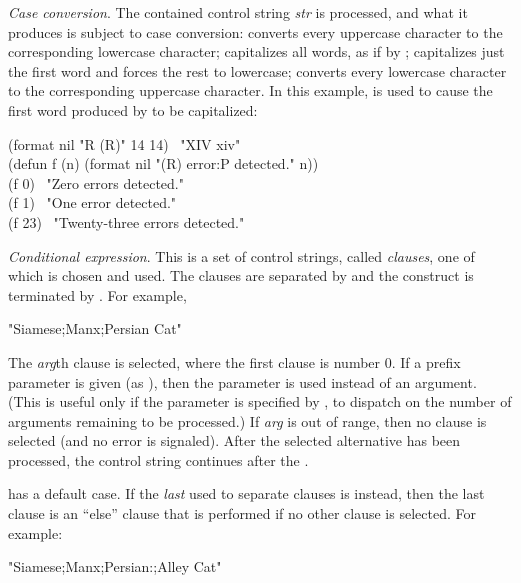\begin{flushdesc}
\item[\cd{{\Xtilde}(\emph{str}{\Xtilde})}]
\emph{Case conversion}.
The contained control string \emph{str} is processed, and what it produces
is subject to case conversion:
\cd{{\Xtilde}(} converts every uppercase character
to the corresponding lowercase character;
\cd{{\Xtilde}:(} capitalizes all words, as if by ;
\cd{{\Xtilde}{\Xatsign}(} capitalizes just the first word and forces the rest to lowercase;
\cd{{\Xtilde}:{\Xatsign}(} converts every lowercase character
to the corresponding uppercase character.
In this example, \cd{{\Xtilde}{\Xatsign}(} is used to cause the first word
produced by  to be capitalized:
\begin{lisp}
(format nil "{\Xtilde}{\Xatsign}R {\Xtilde}({\Xtilde}{\Xatsign}R{\Xtilde})" 14 14) \EV\ "XIV xiv" \\
(defun f (n) (format nil "{\Xtilde}{\Xatsign}({\Xtilde}R{\Xtilde}) error{\Xtilde}:P detected." n)) \\
(f 0) \EV\ "Zero errors detected." \\
(f 1) \EV\ "One error detected." \\
(f 23) \EV\ "Twenty-three errors detected."
\end{lisp}

\item[\cd{{\Xtilde}{\Xlbracket}\emph{str0}{\Xtilde};\emph{str1}{\Xtilde};\emph{...}{\Xtilde};\emph{strn}{\Xtilde}{\Xrbracket}}]
\emph{Conditional expression}.
This is a set of control strings, called \emph{clauses}, one of which is
chosen and used.  The clauses are separated by \cd{{\Xtilde};} and the construct
is terminated by \cd{{\Xtilde}{\Xrbracket}}.  For example,
\begin{lisp}
"{\Xtilde}{\Xlbracket}Siamese{\Xtilde};Manx{\Xtilde};Persian{\Xtilde}{\Xrbracket} Cat"
\end{lisp}
The \emph{arg}th
clause is selected, where the first clause is number 0.
If a prefix parameter is given (as ),
then the parameter is used instead of an argument.
(This is useful only if the parameter is specified by \cd{\#},
to dispatch on the number of arguments remaining to be processed.)
If \emph{arg} is out of range, then no clause is selected
(and no error is signaled).
After the selected alternative has been processed, the control string
continues after the \cd{{\Xtilde}{\Xrbracket}}.

 has a default case.
If the \emph{last} \cd{{\Xtilde};} used to separate clauses
is \cd{{\Xtilde}:;} instead, then the last clause is an ``else'' clause
that is performed if no other clause is selected.
For example:
\begin{lisp}
"{\Xtilde}{\Xlbracket}Siamese{\Xtilde};Manx{\Xtilde};Persian{\Xtilde}:;Alley{\Xtilde}{\Xrbracket} Cat"
\end{lisp}


\end{flushdesc}
